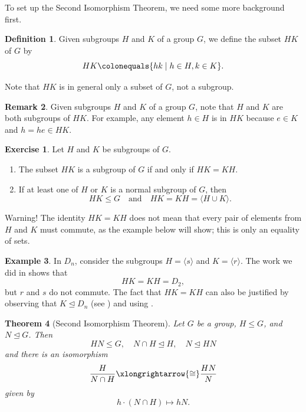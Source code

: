 \documentclass[12pt]{report}
\newtheorem{theorem}{Theorem}[chapter]
\numberwithin{equation}{section}
\numberwithin{theorem}{chapter}
\theoremstyle{definition}
\newtheorem{definition}[theorem]{Definition}
\newtheorem{example}[theorem]{Example}
\newtheorem{exercise}{Exercise}
\newtheorem*{basic properties}{Basic Properties}
\newtheorem*{Important Remark}{Important Remark}
\newtheorem{remark}[theorem]{Remark}
\def\norm{\mathrel{\unlhd}}
\begin{document}
\vspace{1em}

To set up the Second Isomorphism Theorem, we need some more background first.

\begin{definition}
Given subgroups $H$ and $K$ of a group $G$, we define the subset $HK$ of $G$ by
$$HK \colonequals \{hk \mid h \in H, k\in K\}.$$	
\end{definition}

Note that $HK$ is in general only a subset of $G$, not a subgroup.


\begin{remark}
	Given subgroups $H$ and $K$ of a group $G$, note that $H$ and $K$ are both subgroups of $HK$. For example, any element $h \in H$ is in $HK$ because $e \in K$ and $h = he \in HK$.
\end{remark}


\begin{exercise}\label{exercise HK=KH}
Let $H$ and $K$ be subgroups of $G$.	
\begin{enumerate}[leftmargin=10pt]
\item The subset $HK$ is a subgroup of $G$ if and only if $HK=KH$.
\item If at least one of $H$ or $K$ is a normal subgroup of $G$, then 
$$HK\leq G \quad \textrm{and} \quad HK=KH=\langle H\cup K\rangle.$$
\end{enumerate}
\end{exercise}

Warning! The identity $HK=KH$ does not mean that every pair of elements from $H$ and $K$ must commute, as the example below will show; this is only an equality of sets.

\begin{example}
In $D_{n}$, consider the subgroups $H=\langle s\rangle$ and $K=\langle r\rangle$. The work we did in  shows that 
$$HK=KH=D_{2},$$ 
but $r$ and $s$ do not commute. The fact that $HK=KH$ can also be justified by observing that $K\norm D_{n}$ (see ) and using .
\end{example}


\begin{theorem}[Second Isomorphism Theorem]\label{Second Isomorphism Theorem}
Let $G$ be a group, $H \leq G$, and $N \norm G$. Then 
$$HN \leq G, \quad N \cap H \norm H, \quad N \norm HN$$ 
and there is an isomorphism
$$\frac{H}{N \cap H} \xlongrightarrow{\cong} \frac{HN}{N}$$
given by 
$$h \cdot (N \cap H) \mapsto hN.$$
\end{theorem}
\end{document}
